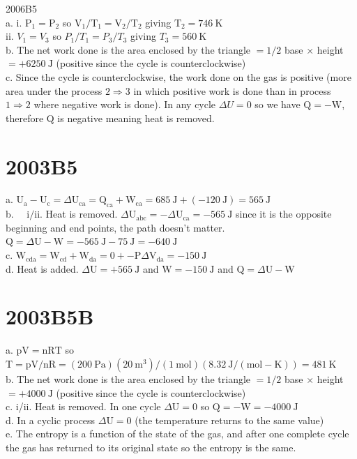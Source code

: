 \begin{enumerate}
2006B5\\
a. i. $\mathrm{P}_{1}=\mathrm{P}_{2}$ so $\mathrm{V}_{1} / \mathrm{T}_{1}=\mathrm{V}_{2} / \mathrm{T}_{2}$ giving $\mathrm{T}_{2}=746 \mathrm{~K}$\\
ii. $V_{1}=V_{3}$ so $P_{1} / T_{1}=P_{3} / T_{3}$ giving $T_{3}=560 \mathrm{~K}$\\
b. The net work done is the area enclosed by the triangle $=1 / 2$ base $\times$ height $=+6250 \mathrm{~J}$ (positive since the cycle is counterclockwise)\\
c. Since the cycle is counterclockwise, the work done on the gas is positive (more area under the process $2 \Rightarrow 3$ in which positive work is done than in process $1 \Rightarrow 2$ where negative work is done). In any cycle $\Delta U=0$ so we have $\mathrm{Q}=-\mathrm{W}$, therefore Q is negative meaning heat is removed.

\section*{2003B5}
a. $\mathrm{U}_{\mathrm{a}}-\mathrm{U}_{\mathrm{c}}=\Delta \mathrm{U}_{\mathrm{ca}}=\mathrm{Q}_{\mathrm{ca}}+\mathrm{W}_{\mathrm{ca}}=685 \mathrm{~J}+(-120 \mathrm{~J})=565 \mathrm{~J}$\\
b. $\quad \mathrm{i} / \mathrm{ii}$. Heat is removed. $\Delta \mathrm{U}_{\mathrm{abc}}=-\Delta \mathrm{U}_{\mathrm{ca}}=-565 \mathrm{~J}$ since it is the opposite beginning and end points, the path doesn't matter. $\mathrm{Q}=\Delta \mathrm{U}-\mathrm{W}=-565 \mathrm{~J}-75 \mathrm{~J}=-640 \mathrm{~J}$\\
c. $\mathrm{W}_{\mathrm{cda}}=\mathrm{W}_{\mathrm{cd}}+\mathrm{W}_{\mathrm{da}}=0+-\mathrm{P} \Delta \mathrm{V}_{\mathrm{da}}=-150 \mathrm{~J}$\\
d. Heat is added. $\Delta \mathrm{U}=+565 \mathrm{~J}$ and $\mathrm{W}=-150 \mathrm{~J}$ and $\mathrm{Q}=\Delta \mathrm{U}-\mathrm{W}$

\section*{2003B5B}
a. $\mathrm{pV}=\mathrm{nRT}$ so $\mathrm{T}=\mathrm{pV} / \mathrm{nR}=(200 \mathrm{~Pa})\left(20 \mathrm{~m}^{3}\right) /(1 \mathrm{~mol})(8.32 \mathrm{~J} /(\mathrm{mol}-\mathrm{K}))=481 \mathrm{~K}$\\
b. The net work done is the area enclosed by the triangle $=1 / 2$ base $\times$ height $=+4000 \mathrm{~J}$ (positive since the cycle is counterclockwise)\\
c. i/ii. Heat is removed. In one cycle $\Delta \mathrm{U}=0$ so $\mathrm{Q}=-\mathrm{W}=-4000 \mathrm{~J}$\\
d. In a cyclic process $\Delta \mathrm{U}=0$ (the temperature returns to the same value)\\
e. The entropy is a function of the state of the gas, and after one complete cycle the gas has returned to its original state so the entropy is the same.


\end{enumerate}
